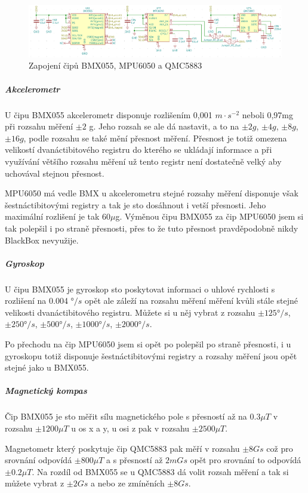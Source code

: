 \begin{figure}[htbp]
    \centering
    \includegraphics[width=\textwidth]{kapitoly/obrazky/E4/vnimani/BMX-MPU-QMC.png}
    \caption{Zapojení čipů BMX055, MPU6050 a QMC5883}
    \label{fig:E4-9axis}
\end{figure}

\subparagraph*{Akcelerometr}
U čipu BMX055 akcelerometr disponuje rozlišením 0,001 $m \cdot s^{-2}$ neboli 0,97mg při rozsahu měření $\pm2$ g. Jeho rozsah se ale dá nastavit, a to na $\pm2g$, $\pm4g$, $\pm8g$, $\pm16g$, 
podle rozsahu se také mění přesnost měření. Přesnost je totiž omezena velikostí dvanáctibitového registru do kterého se ukládají informace a při využívání většího 
rozsahu měření už tento registr není dostatečně velký aby uchovával stejnou přesnost.

MPU6050 má vedle BMX u akcelerometru stejné rozsahy měření disponuje však šestnáctibitovými registry a tak je sto dosáhnout i vetší přesnosti. Jeho maximální rozlišení je 
tak 60$\mu$g. Výměnou čipu BMX055 za čip MPU6050 jsem si tak polepšil i po straně přesnosti, přes to že tuto přesnost pravděpodobně nikdy BlackBox nevyužije. %

\subparagraph*{Gyroskop}
U čipu BMX055 je gyroskop sto poskytovat informaci o uhlové rychlosti s rozlišení na 0.004 $°/s$ opět ale záleží na rozsahu měření měření kvůli stále stejné velikosti 
dvanáctibitového registru. Můžete si u něj vybrat z rozsahu $\pm125°/s$, $\pm250°/s$, $\pm500°/s$, $\pm1 000°/s$, $\pm2 000°/s$.

Po přechodu na čip MPU6050 jsem si opět po polepšil po straně přesnosti, i u gyroskopu totiž disponuje šestnáctibitovými registry a rozsahy měření jsou opět stejné jako u BMX055.

\subparagraph*{Magnetický kompas}
Čip BMX055 je sto měřit sílu magnetického pole s přesností až na  $0.3\mu T$ v rozsahu $\pm1200\mu T$ u os x a y, u osi z pak v rozsahu $\pm2500\mu T$.

Magnetometr který poskytuje čip QMC5883 pak měří v rozsahu $\pm8Gs$ což pro srovnání odpovídá $\pm800\mu T$ a s přesností až $2mGs$ opět pro srovnání to odpovídá $\pm0.2\mu T$.
Na rozdíl od BMX055 se u QMC5883 dá volit rozsah měření a tak si můžete vybrat z $\pm2Gs$ a nebo ze zmíněních $\pm8Gs$.

